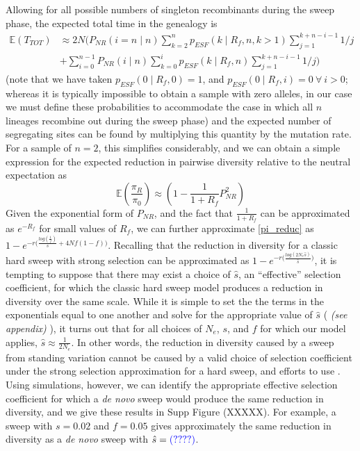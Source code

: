 \documentclass[a4paper,10pt]{article}
\newcommand{\jb}[1]{{\it\color{blue} (#1)} }
\begin{document}
Allowing for all possible numbers of singleton recombinants during the sweep phase, the expected total time in the genealogy is
\begin{equation}
	\begin{aligned}
		\mathbb{E}(T_{TOT})  	&\approx 2N \biggl( P_{NR}(i=n\mid  n)  \sum_{k=2}^n p_{ESF}(k\mid R_f,n , k > 1)   \sum_{j=1}^{k+n-i-1} 1/j \\
							&+ \sum_{i=0}^{n-1} P_{NR} ( i \mid n) \sum_{k=0}^i p_{ESF}(k\mid R_f,n)   \sum_{j=1}^{k+n-i-1} 1/j\biggr)
	\end{aligned}
\end{equation}
(note that we have taken $p_{ESF}\left(0 \mid R_f,0\right)=1$, and $p_{ESF}\left(0 \mid R_f,i\right)=0\ \forall\ i > 0$; whereas it is typically impossible to obtain a sample with zero alleles, in our case we must define these probabilities to accommodate the case in which all $n$ lineages recombine out during the sweep phase)
and the expected number of segregating sites can be found by multiplying this quantity by the mutation rate. For a sample of $n = 2$, this simplifies considerably, and we can obtain a simple expression for the expected reduction in pairwise diversity relative to the neutral expectation as
\begin{equation}
	\mathbb{E}\left(\frac{\pi_R}{\pi_0}\right) \approx \left(1-\frac{1}{1 + R_f} P_{NR}^2  \right) \label{pi_reduc}
\end{equation}
Given the exponential form of $P_{NR}$, and the fact that $\frac{1}{1+R_f}$ can be approximated as $e^{-R_f}$ for small values of $R_f$, we can further approximate \eqref{pi_reduc} as $1- e^{-r\bigl(\frac{log\left(\frac{1}{f}\right)}{s} + 4Nf(1-f)\bigr)}$. Recalling that the reduction in diversity for a classic hard sweep with strong selection can be approximated as $1- e^{-r\bigl(\frac{log\left(2N_e \hat{s}\right)}{\hat{s}}\bigr)}$, it is tempting to suppose that there may exist a choice of $\hat{s}$, an ``effective'' selection coefficient, for which the classic hard sweep model produces a reduction in diversity over the same scale. While it is simple to set the the terms in the exponentials equal to one another and solve for the appropriate value of $\hat{s}$ (\jb{see appendix}), it turns out that for all choices of $N_e$, $s$, and $f$ for which our model applies, $\hat{s} \approx \frac{1}{2N_e}$. In other words, the reduction in diversity caused by a sweep from standing variation cannot be caused by a valid choice of selection coefficient under the strong selection approximation for a hard sweep, and efforts to use . Using simulations, however, we can identify the appropriate effective selection coefficient for which a \textit{de novo} sweep would produce the same reduction in diversity, and we give these results in Supp Figure (XXXXX). For example, a sweep with $s=0.02$ and $f=0.05$ gives approximately the same reduction in diversity as a \textit{de novo} sweep with $\hat{s} = \jb{????}$.
\end{document}
